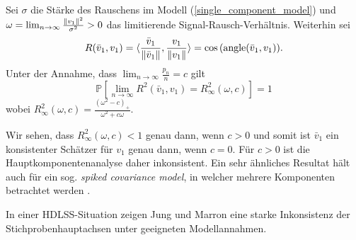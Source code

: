 \begin{thm}
\label{pca_inconsistency_ratio}
Sei $\sigma$ die Stärke des Rauschens im Modell (\ref{single_component_model}) und $\omega = \lim_{n \rightarrow \infty} \frac{\left\lVert v_1 \right\rVert^{2}}{\sigma^2} > 0$ das limitierende Signal-Rausch-Verhältnis. Weiterhin sei 
$$R(\bar{v}_1, v_1) = \langle \frac{\bar{v}_1}{\left\lVert \bar{v}_1 \right\rVert}, \frac{v_1}{\left\lVert v_1 \right\rVert} \rangle = \cos{(\operatorname{angle}(\bar{v}_1, v_1))}.$$
Unter der Annahme, dass $\lim_{n \rightarrow \infty} \frac{p_n}{n} = c$ gilt
$$\mathbb{P}\left[\lim_{n \rightarrow \infty} R^2(\bar{v}_1, v_1) = R_{\infty}^2(\omega, c)\right] = 1$$
wobei $R_{\infty}^2(\omega, c) = \frac{(\omega^2 - c)_+}{\omega^2 + c\omega}$.
\end{thm}

Wir sehen, dass $R_{\infty}^2(\omega, c) < 1$ genau dann, wenn $c > 0$ und somit ist $\bar{v}_1$ ein konsistenter Schätzer für $v_1$ genau dann, wenn $c = 0$. Für $c > 0$ ist die Hauptkomponentenanalyse daher inkonsistent. Ein sehr ähnliches Resultat hält auch für ein sog. \textit{spiked covariance model}, in welcher mehrere Komponenten betrachtet werden \cite{paul}.

In einer HDLSS-Situation zeigen Jung und Marron \cite{jung} eine starke Inkonsistenz der Stichprobenhauptachsen unter geeigneten Modellannahmen.

\begin{thm}
\label{pca_inconsistency_hdlss}
\end{thm}

